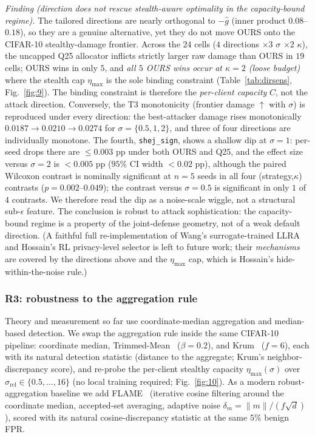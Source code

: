 \documentclass[final,1p,times]{elsarticle}
\begin{document}
\emph{Finding (direction does not rescue stealth-aware optimality in the
capacity-bound regime).} The tailored directions are nearly orthogonal to
$-\hat g$ (inner product $0.08$--$0.18$), so they are a genuine
alternative, yet they do not move OURS onto the CIFAR-10
stealthy-damage frontier. Across the $24$ cells
($4$ directions $\times 3$ $\sigma$ $\times 2$ $\kappa$), the uncapped
Q25 allocator inflicts strictly larger raw damage than OURS in $19$ cells;
OURS wins in only $5$, and \emph{all $5$ OURS wins occur at
$\kappa{=}2$ (loose budget)} where the stealth cap $\eta_{\max}$ is the
sole binding constraint (Table~\ref{tab:dirsens}, Fig.~\ref{fig:9}). The
binding constraint is therefore the \emph{per-client capacity} $C$, not
the attack direction. Conversely, the T3 monotonicity (frontier damage
$\uparrow$ with $\sigma$) is reproduced under every direction: the
best-attacker damage rises monotonically
$0.0187\!\to\!0.0210\!\to\!0.0274$ for $\sigma{=}\{0.5,1,2\}$, and three
of four directions are individually monotone. The fourth,
\texttt{shej\_sign}, shows a shallow dip at $\sigma{=}1$: per-seed drops
there are $\le 0.003$ pp under both OURS and Q25, and the effect size
versus $\sigma{=}2$ is $<0.005$ pp ($95\%$ CI width $<0.02$ pp), although
the paired Wilcoxon contrast is nominally significant at $n{=}5$ seeds in
all four (strategy,$\kappa$) contrasts ($p{=}0.002$--$0.049$); the
contrast versus $\sigma{=}0.5$ is significant in only $1$ of $4$
contrasts. We therefore read the dip as a noise-scale wiggle, not a
structural sub-$\epsilon$ feature.
The conclusion is robust to attack sophistication: the capacity-bound
regime is a property of the joint-defense geometry, not of a weak default
direction. (A faithful full re-implementation of Wang's surrogate-trained
LLRA and Hossain's RL privacy-level selector is left to future work; their
\emph{mechanisms} are covered by the directions above and the
$\eta_{\max}$ cap, which is Hossain's hide-within-the-noise rule.)

\subsubsection{R3: robustness to the aggregation rule}
\label{sec:r3}
Theory and measurement so far use coordinate-median aggregation and
median-based detection. We swap the aggregation rule inside the same
CIFAR-10 pipeline: coordinate median, Trimmed-Mean~\cite{yin2018}
($\beta{=}0.2$), and Krum~\cite{blanchard2017} ($f{=}6$), each with its
natural detection statistic (distance to the aggregate; Krum's
neighbor-discrepancy score), and re-probe the per-client stealthy
capacity $\eta_{\max}(\sigma)$ over
$\sigma_{\mathrm{rel}}\in\{0.5,\dots,16\}$ (no local training required;
Fig.~\ref{fig:10}). As a modern robust-aggregation baseline we add
FLAME~\cite{allouah2023flame} (iterative cosine filtering around the
coordinate median, accepted-set averaging, adaptive noise
$\delta_m{=}\lVert m\rVert/(f\sqrt d)$), scored with its natural
cosine-discrepancy statistic at the same $5\%$ benign FPR.
\end{document}

